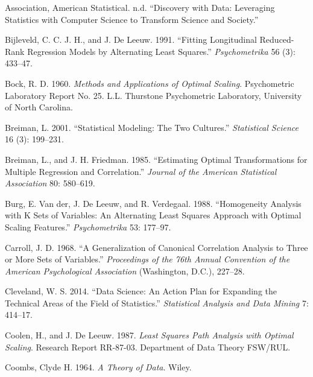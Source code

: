\documentclass[
  12pt,
  letterpaper,
  DIV=11,
  numbers=noendperiod]{scrreprt}
\newlength{\cslhangindent}
\newenvironment{CSLReferences}[2] %
 {\begin{list}{}{%
  \setlength{\itemindent}{0pt}
  \setlength{\leftmargin}{0pt}
  \setlength{\parsep}{0pt}
  \ifodd #1
   \setlength{\leftmargin}{\cslhangindent}
   \setlength{\itemindent}{-1\cslhangindent}
  \fi
  \setlength{\itemsep}{#2\baselineskip}}}
 {\end{list}}
\begin{document}
\protect{}\label{refs}
\begin{CSLReferences}{1}{1}
Association, American Statistical. n.d. {``{Discovery with Data:
Leveraging Statistics with Computer Science to Transform Science and
Society}.''}

Bijleveld, C. C. J. H., and J. De Leeuw. 1991. {``{Fitting Longitudinal
Reduced-Rank Regression Models by Alternating Least Squares}.''}
\emph{Psychometrika} 56 (3): 433--47.

Bock, R. D. 1960. \emph{{Methods and Applications of Optimal Scaling}}.
Psychometric Laboratory Report No. 25. L.L. Thurstone Psychometric
Laboratory, University of North Carolina.

Breiman, L. 2001. {``{Statistical Modeling: The Two Cultures}.''}
\emph{Statistical Science} 16 (3): 199--231.

Breiman, L., and J. H. Friedman. 1985. {``{Estimating Optimal
Transformations for Multiple Regression and Correlation}.''}
\emph{Journal of the American Statistical Association} 80: 580--619.

Burg, E. Van der, J. De Leeuw, and R. Verdegaal. 1988. {``Homogeneity
Analysis with {K} Sets of Variables: An Alternating Least Squares
Approach with Optimal Scaling Features.''} \emph{Psychometrika} 53:
177--97.

Carroll, J. D. 1968. {``{A Generalization of Canonical Correlation
Analysis to Three or More Sets of Variables}.''} \emph{Proceedings of
the 76th Annual Convention of the American Psychological Association}
(Washington, D.C.), 227--28.

Cleveland, W. S. 2014. {``{Data Science: An Action Plan for Expanding
the Technical Areas of the Field of Statistics}.''} \emph{Statistical
Analysis and Data Mining} 7: 414--17.

Coolen, H., and J. De Leeuw. 1987. \emph{{Least Squares Path Analysis
with Optimal Scaling}}. Research Report RR-87-03. Department of Data
Theory FSW/RUL.

Coombs, Clyde H. 1964. \emph{{A Theory of Data}}. Wiley.


\end{CSLReferences}
\end{document}
